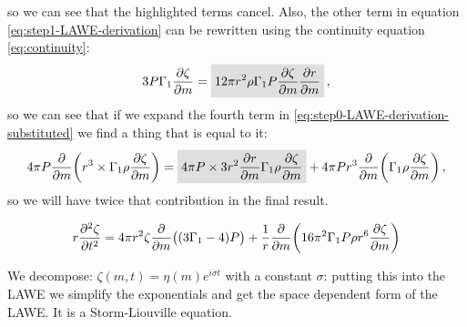 \documentclass[main.tex]{subfiles}
\begin{document}
%
so we can see that the highlighted terms cancel.
Also, the other term in equation \eqref{eq:step1-LAWE-derivation} can be rewritten using the continuity equation \eqref{eq:continuity}: 
%
\begin{align}
3P \Gamma_1 \pdv{\zeta }{m} 
= \hlc{lightgray}{12 \pi r^2 \rho  \Gamma_1 P \pdv{\zeta }{m} \pdv{r}{m}}
\,,
\end{align}
%
so we can see that if we expand the fourth term in \eqref{eq:step0-LAWE-derivation-substituted} we find a thing that is equal to it: 
%
\begin{align}
4 \pi P \pdv{}{m} \qty(r^3 \times  \Gamma_1  \rho \pdv{\zeta }{m})
= \hlc{lightgray}{4 \pi P \times 3 r^2 \pdv{r}{m} \Gamma_1 \rho \pdv{\zeta }{m}}
+  4 \pi P r^3 \pdv{}{m} \qty(\Gamma_1 \rho \pdv{\zeta }{m})
\,,
\end{align}
%
so we will have twice that contribution in the final result.


\begin{equation}
  r \pdv[2]{\zeta}{t} =
  4 \pi r^2 \zeta \pdv{}{m} \qty((3 \Gamma_1 - 4)P)+
  \frac{1}{r} \pdv{}{m} \qty(16 \pi^2 \Gamma_1 P \rho r^6 \pdv{\zeta}{m} )
\end{equation}

We decompose: \(\zeta(m, t) = \eta(m) e^{i \sigma t}\) with a constant \(\sigma\): putting this into the LAWE we simplify the exponentials and get the space dependent form of the LAWE.
It is a Storm-Liouville equation.
\end{document}
